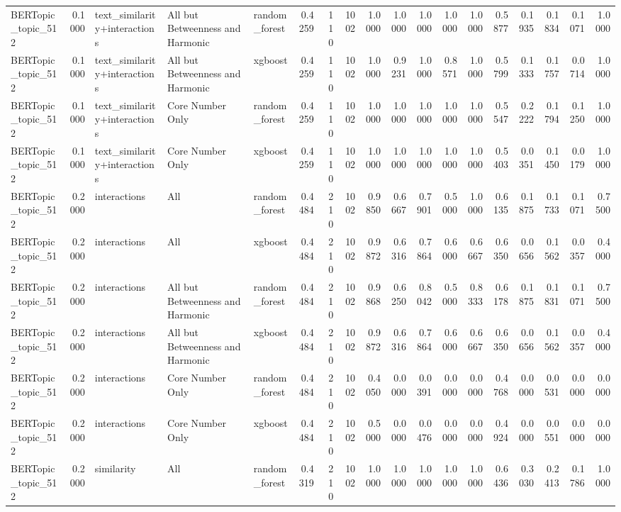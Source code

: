 \begin{tabular}{lrlllrrrrrrrrrrrrr}
BERTopic_topic_512 & 0.1000 & text_similarity+interactions & All but Betweenness and Harmonic & random_forest & 0.4259 & 110 & 1002 & 1.0000 & 1.0000 & 1.0000 & 1.0000 & 1.0000 & 0.5877 & 0.1935 & 0.1834 & 0.1071 & 1.0000 \\
BERTopic_topic_512 & 0.1000 & text_similarity+interactions & All but Betweenness and Harmonic & xgboost & 0.4259 & 110 & 1002 & 1.0000 & 0.9231 & 1.0000 & 0.8571 & 1.0000 & 0.5799 & 0.1333 & 0.1757 & 0.0714 & 1.0000 \\
BERTopic_topic_512 & 0.1000 & text_similarity+interactions & Core Number Only & random_forest & 0.4259 & 110 & 1002 & 1.0000 & 1.0000 & 1.0000 & 1.0000 & 1.0000 & 0.5547 & 0.2222 & 0.1794 & 0.1250 & 1.0000 \\
BERTopic_topic_512 & 0.1000 & text_similarity+interactions & Core Number Only & xgboost & 0.4259 & 110 & 1002 & 1.0000 & 1.0000 & 1.0000 & 1.0000 & 1.0000 & 0.5403 & 0.0351 & 0.1450 & 0.0179 & 1.0000 \\
BERTopic_topic_512 & 0.2000 & interactions & All & random_forest & 0.4484 & 210 & 1002 & 0.9850 & 0.6667 & 0.7901 & 0.5000 & 1.0000 & 0.6135 & 0.1875 & 0.1733 & 0.1071 & 0.7500 \\
BERTopic_topic_512 & 0.2000 & interactions & All & xgboost & 0.4484 & 210 & 1002 & 0.9872 & 0.6316 & 0.7864 & 0.6000 & 0.6667 & 0.6350 & 0.0656 & 0.1562 & 0.0357 & 0.4000 \\
BERTopic_topic_512 & 0.2000 & interactions & All but Betweenness and Harmonic & random_forest & 0.4484 & 210 & 1002 & 0.9868 & 0.6250 & 0.8042 & 0.5000 & 0.8333 & 0.6178 & 0.1875 & 0.1831 & 0.1071 & 0.7500 \\
BERTopic_topic_512 & 0.2000 & interactions & All but Betweenness and Harmonic & xgboost & 0.4484 & 210 & 1002 & 0.9872 & 0.6316 & 0.7864 & 0.6000 & 0.6667 & 0.6350 & 0.0656 & 0.1562 & 0.0357 & 0.4000 \\
BERTopic_topic_512 & 0.2000 & interactions & Core Number Only & random_forest & 0.4484 & 210 & 1002 & 0.4050 & 0.0000 & 0.0391 & 0.0000 & 0.0000 & 0.4768 & 0.0000 & 0.0531 & 0.0000 & 0.0000 \\
BERTopic_topic_512 & 0.2000 & interactions & Core Number Only & xgboost & 0.4484 & 210 & 1002 & 0.5000 & 0.0000 & 0.0476 & 0.0000 & 0.0000 & 0.4924 & 0.0000 & 0.0551 & 0.0000 & 0.0000 \\
BERTopic_topic_512 & 0.2000 & similarity & All & random_forest & 0.4319 & 210 & 1002 & 1.0000 & 1.0000 & 1.0000 & 1.0000 & 1.0000 & 0.6436 & 0.3030 & 0.2413 & 0.1786 & 1.0000 \\

\end{tabular}
